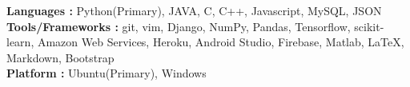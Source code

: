

\textbf{Languages :}  Python(Primary), JAVA, C, C++, Javascript, MySQL, JSON \\
\textbf{Tools/Frameworks :} git, vim, Django, NumPy, Pandas, Tensorflow, scikit-learn, Amazon Web Services, Heroku, Android Studio, Firebase, Matlab, \LaTeX, Markdown, Bootstrap\\
\textbf{Platform :} Ubuntu(Primary), Windows